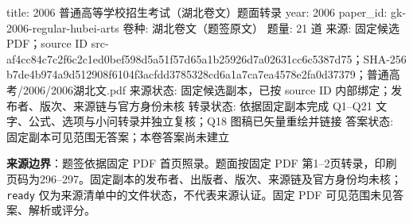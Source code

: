 title: 2006 普通高等学校招生考试（湖北卷文）题面转录
year: 2006
paper_id: gk-2006-regular-hubei-arts
卷种: 湖北卷文（题签原文）
题量: 21 道
来源: 固定候选 PDF；source ID src-af4cc84c7c2f6c2c1ed0bef598d5a51f57d65a1b25926d7a02631cc6c5387d75；SHA-256 b7de4b974a9d512908f6104f3acfdd3785328cd6a1a7ca7ea4578e2fa0d37379；普通高考/2006/2006湖北文.pdf
来源状态: 固定候选副本，已按 source ID 内部绑定；发布者、版次、来源链与官方身份未核
转录状态: 依据固定副本完成 Q1–Q21 文字、公式、选项与小问转录并独立复核；Q18 图稿已矢量重绘并链接
答案状态: 固定副本可见范围无答案；本卷答案尚未建立
\par\medskip

\begin{gktip}
\textbf{来源边界}：题签依据固定 PDF 首页照录。题面按固定 PDF 第1–2页转录，印刷页码为296–297。固定副本的发布者、出版者、版次、来源链及官方身份均未核；\texttt{ready} 仅为来源清单中的文件状态，不代表来源认证。固定 PDF 可见范围未见答案、解析或评分。
\end{gktip}


